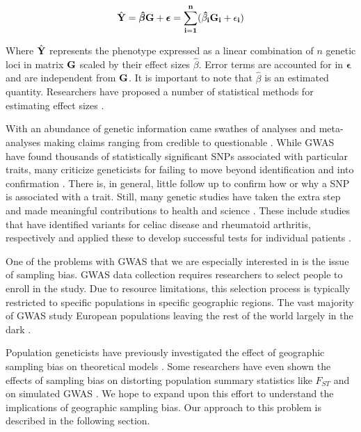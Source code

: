 \begin{equation}
    \hat{\bf{Y}} = \boldsymbol{\hat{\beta}} \bf{G} + \boldsymbol{\epsilon} = \sum_{i=1}^{n} (\hat{\beta_i} G_i + \epsilon_i) 
\end{equation}

Where $\hat{\bf{Y}}$ represents the phenotype expressed as a linear combination of $n$ genetic loci in matrix $\bf{G}$ scaled by their effect sizes $\hat{\beta}$. Error terms are accounted for in $\boldsymbol{\epsilon}$ and are independent from $\bf{G}$. It is important to note that $\hat{\beta}$ is an estimated quantity. Researchers have proposed a number of statistical methods for estimating effect sizes \cite{meuwissen_prediction_2001} \cite{park_distribution_2011}.


With an abundance of genetic information came swathes of analyses and meta-analyses making claims ranging from credible to questionable \cite{ganna_large-scale_2019}. While GWAS have found thousands of statistically significant SNPs associated with particular traits, many criticize geneticists for failing to move beyond identification and into confirmation \cite{visscher_five_2012}. There is, in general, little follow up to confirm how or why a SNP is associated with a trait. Still, many genetic studies have taken the extra step and made meaningful contributions to health and science \cite{belbin_2017}. These include studies that have identified variants for celiac disease and rheumatoid arthritis, respectively and applied these to develop successful tests for individual patients \cite{abraham_accurate_2014} \cite{han_fine_2014}. 


One of the problems with GWAS that we are especially interested in is the issue of sampling bias. GWAS data collection requires researchers to select people to enroll in the study. Due to resource limitations, this selection process is typically restricted to specific populations in specific geographic regions. The vast majority of GWAS study European populations \cite{need_next_2009} \cite{popejoy_genomics_2016} leaving the rest of the world largely in the dark \cite{wojcik_genetic_2019}. 


Population geneticists have previously investigated the effect of geographic sampling bias on theoretical models \cite{mcvean_genealogical_2009}. Some researchers have even shown the effects of sampling bias on distorting population summary statistics like $F_{ST}$ and on simulated GWAS \cite{battey_space_2019}. We hope to expand upon this effort to understand the implications of geographic sampling bias. Our approach to this problem is described in the following section.


